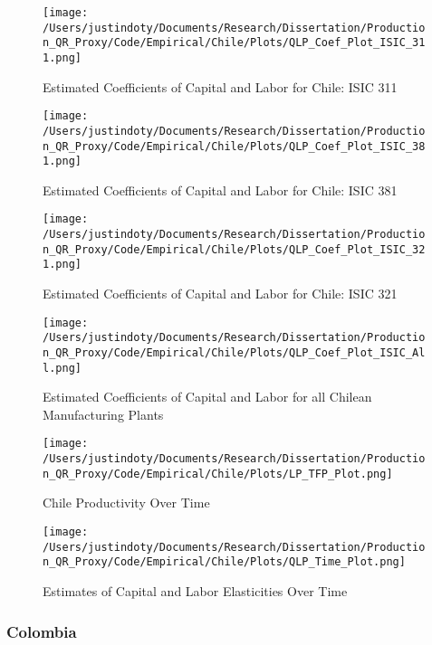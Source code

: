 \documentclass[11pt]{article}
\begin{document}
\begin{figure}[H]
\centering
\caption{Estimated Coefficients of Capital and Labor for Chile: ISIC 311}
\texttt{[image: /Users/justindoty/Documents/Research/Dissertation/Production\_QR\_Proxy/Code/Empirical/Chile/Plots/QLP\_Coef\_Plot\_ISIC\_311.png]}
\label{fig:LPCHL311}
\end{figure}

\begin{figure}[H]
\centering
\caption{Estimated Coefficients of Capital and Labor for Chile: ISIC 381}
\texttt{[image: /Users/justindoty/Documents/Research/Dissertation/Production\_QR\_Proxy/Code/Empirical/Chile/Plots/QLP\_Coef\_Plot\_ISIC\_381.png]}
\label{fig:LPCHL381}
\end{figure}

\begin{figure}[H]
\centering
\caption{Estimated Coefficients of Capital and Labor for Chile: ISIC 321}
\texttt{[image: /Users/justindoty/Documents/Research/Dissertation/Production\_QR\_Proxy/Code/Empirical/Chile/Plots/QLP\_Coef\_Plot\_ISIC\_321.png]}
\label{fig:LPCHL321}
\end{figure}

\begin{figure}[H]
\centering
\caption{Estimated Coefficients of Capital and Labor for all Chilean Manufacturing Plants}
\texttt{[image: /Users/justindoty/Documents/Research/Dissertation/Production\_QR\_Proxy/Code/Empirical/Chile/Plots/QLP\_Coef\_Plot\_ISIC\_All.png]}
\label{fig:LPCHLall}
\end{figure}

\begin{figure}[H]
\centering
\caption{Chile Productivity Over Time}
\texttt{[image: /Users/justindoty/Documents/Research/Dissertation/Production\_QR\_Proxy/Code/Empirical/Chile/Plots/LP\_TFP\_Plot.png]}
\label{fig:LPCHLpgrowth}
\end{figure}

\begin{figure}[H]
\centering
\caption{Estimates of Capital and Labor Elasticities Over Time}
\texttt{[image: /Users/justindoty/Documents/Research/Dissertation/Production\_QR\_Proxy/Code/Empirical/Chile/Plots/QLP\_Time\_Plot.png]}
\label{fig:LPCHLtimecoef}
\end{figure}

\subsubsection{Colombia}
\end{document}
